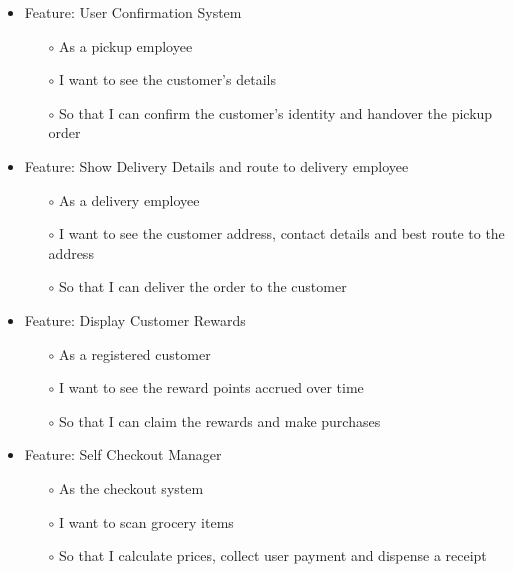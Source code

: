\documentclass{scrreprt}
\begin{document}
\begin{itemize}
	\item Feature: User Confirmation System
	\begin{itemize}
		\item[$\circ$]As a pickup employee
		\item[$\circ$]I want to see the customer’s details 
		\item[$\circ$]So that I can confirm the customer’s identity and handover the pickup order
	\end{itemize}
\end{itemize}

\begin{itemize}
	\item Feature: Show Delivery Details and route to delivery employee
	\begin{itemize}
		\item[$\circ$]As a delivery employee
		\item[$\circ$]I want to see the customer address, contact details and best route to the address
		\item[$\circ$]So that I can deliver the order to the customer
	\end{itemize}
\end{itemize}

\begin{itemize}
	\item Feature: Display Customer Rewards
	\begin{itemize}
		\item[$\circ$]As a registered customer
		\item[$\circ$]I want to see the reward points accrued over time
		\item[$\circ$]So that I can claim the rewards and make purchases
	\end{itemize}
\end{itemize}

\begin{itemize}
	\item Feature: Self Checkout Manager
	\begin{itemize}
		\item[$\circ$]As the checkout system
		\item[$\circ$]I want to scan grocery items
		\item[$\circ$]So that I calculate prices, collect user payment and dispense a receipt
	\end{itemize}
\end{itemize}
\end{document}
